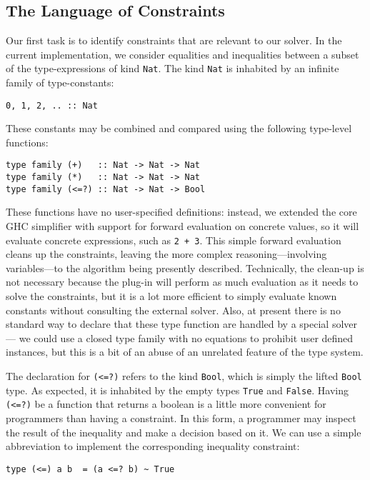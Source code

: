 \documentclass{sigplanconf}
\begin{document}


\subsection{The Language of Constraints}
Our first task is to identify constraints that are relevant to our solver.
In the current implementation, we consider equalities and inequalities
between a subset of the type-expressions of kind \Verb"Nat".
The kind \Verb"Nat" is
inhabited by an infinite family of type-constants:
\begin{Verbatim}
0, 1, 2, .. :: Nat
\end{Verbatim}
These constants may be combined and compared using the following
type-level functions:
\begin{Verbatim}
type family (+)   :: Nat -> Nat -> Nat
type family (*)   :: Nat -> Nat -> Nat
type family (<=?) :: Nat -> Nat -> Bool
\end{Verbatim}
These functions have no user-specified definitions: instead, we extended
the core GHC simplifier with support for forward evaluation on concrete
values, so it will evaluate concrete expressions, such as \Verb"2 + 3".
This simple forward evaluation cleans up the constraints, leaving the more
complex reasoning---involving variables---to the algorithm being presently
described.  Technically, the clean-up is not necessary because the
plug-in will perform as much evaluation as it needs to solve the constraints,
but it is a lot more efficient to simply evaluate known constants without
consulting the external solver.  Also, at present there is no standard
way to declare that these type function are handled by a special solver---%
we could use a closed type family with no equations to prohibit user
defined instances, but this is a bit of an abuse of an unrelated feature
of the type system.

The declaration for \Verb"(<=?)" refers to the kind \Verb"Bool", which
is simply the lifted \Verb"Bool" type.  As expected, it is inhabited by the
empty types \Verb"True" and \Verb"False".   Having \Verb"(<=?)" be a function
that returns a boolean is a little more convenient for programmers than having
a constraint. In this form, a programmer may inspect the result of the
inequality and make a decision based on it.  We can use a simple
abbreviation to implement the corresponding inequality constraint:
\begin{Verbatim}
type (<=) a b  = (a <=? b) ~ True
\end{Verbatim}
\end{document}
